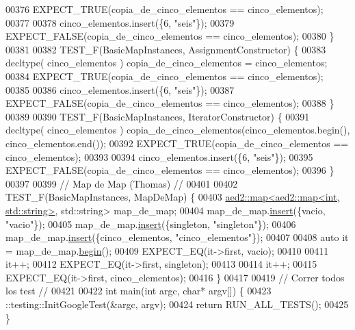 \begin{DoxyCode}
00376     EXPECT\_TRUE(copia\_de\_cinco\_elementos == cinco\_elementos);
00377 
00378     cinco\_elementos.insert(\{6, \textcolor{stringliteral}{"seis"}\});
00379     EXPECT\_FALSE(copia\_de\_cinco\_elementos == cinco\_elementos);
00380 \}
00381 
00382 TEST\_F(BasicMapInstances, AssignmentConstructor) \{
00383     decltype( cinco\_elementos ) copia\_de\_cinco\_elementos = cinco\_elementos;
00384     EXPECT\_TRUE(copia\_de\_cinco\_elementos == cinco\_elementos);
00385 
00386     cinco\_elementos.insert(\{6, \textcolor{stringliteral}{"seis"}\});
00387     EXPECT\_FALSE(copia\_de\_cinco\_elementos == cinco\_elementos);
00388 \}
00389 
00390 TEST\_F(BasicMapInstances, IteratorConstructor) \{
00391     decltype( cinco\_elementos ) copia\_de\_cinco\_elementos(cinco\_elementos.begin(), cinco\_elementos.end());
00392     EXPECT\_TRUE(copia\_de\_cinco\_elementos == cinco\_elementos);
00393 
00394     cinco\_elementos.insert(\{6, \textcolor{stringliteral}{"seis"}\});
00395     EXPECT\_FALSE(copia\_de\_cinco\_elementos == cinco\_elementos);
00396 \}
00397 
00399 \textcolor{comment}{// Map de Map (Thomas) //}
00401 \textcolor{comment}{}
00402 TEST\_F(BasicMapInstances, MapDeMap) \{
00403     \hyperlink{classaed2_1_1map}{aed2::map<aed2::map<int, std::string>}, std::string> map\_de\_map;
00404     map\_de\_map.\hyperlink{classaed2_1_1map_a6941cde9a79c27f054b5c97a587a1854_a6941cde9a79c27f054b5c97a587a1854}{insert}(\{vacio, \textcolor{stringliteral}{"vacio"}\});
00405     map\_de\_map.\hyperlink{classaed2_1_1map_a6941cde9a79c27f054b5c97a587a1854_a6941cde9a79c27f054b5c97a587a1854}{insert}(\{singleton, \textcolor{stringliteral}{"singleton"}\});
00406     map\_de\_map.\hyperlink{classaed2_1_1map_a6941cde9a79c27f054b5c97a587a1854_a6941cde9a79c27f054b5c97a587a1854}{insert}(\{cinco\_elementos, \textcolor{stringliteral}{"cinco\_elementos"}\});
00407 
00408     \textcolor{keyword}{auto} it = map\_de\_map.\hyperlink{classaed2_1_1map_a58a95705d54b3dda7f775ce5a22225cb_a58a95705d54b3dda7f775ce5a22225cb}{begin}();
00409     EXPECT\_EQ(it->first, vacio);
00410 
00411     it++;
00412     EXPECT\_EQ(it->first, singleton);
00413 
00414     it++;
00415     EXPECT\_EQ(it->first, cinco\_elementos);
00416 \}
00417 
00419 \textcolor{comment}{// Correr todos los test //}
00421 \textcolor{comment}{}
00422 \textcolor{keywordtype}{int} main(\textcolor{keywordtype}{int} argc, \textcolor{keywordtype}{char}* argv[]) \{
00423     ::testing::InitGoogleTest(&argc, argv);
00424     \textcolor{keywordflow}{return} RUN\_ALL\_TESTS();
00425 \}
\end{DoxyCode}
